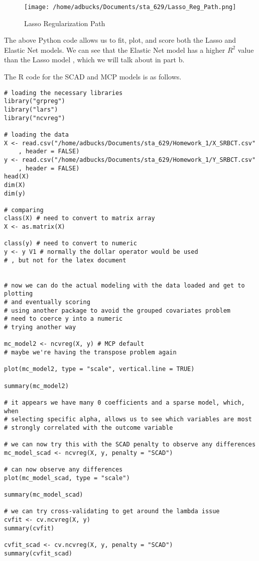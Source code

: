 \documentclass[12pt, letterpaper]{article}
\begin{document}
\begin{figure}
\texttt{[image: /home/adbucks/Documents/sta\_629/Lasso\_Reg\_Path.png]} 
\caption{Lasso Regularization Path} 
\end{figure} 


The above Python code allows us to fit, plot, and score both the Lasso and Elastic Net models. We can see that the Elastic Net model has a higher $R^2$ value than the Lasso model
, which we will talk about in part b. 

The R code for the SCAD and MCP models is as follows. 

\begin{verbatim} 
# loading the necessary libraries 
library("grpreg")
library("lars")
library("ncvreg")

# loading the data 
X <- read.csv("/home/adbucks/Documents/sta_629/Homework_1/X_SRBCT.csv"
	, header = FALSE)
y <- read.csv("/home/adbucks/Documents/sta_629/Homework_1/Y_SRBCT.csv"
	, header = FALSE) 
head(X)
dim(X)
dim(y)

# comparing 
class(X) # need to convert to matrix array 
X <- as.matrix(X)

class(y) # need to convert to numeric
y <- y V1 # normally the dollar operator would be used
# , but not for the latex document 


# now we can do the actual modeling with the data loaded and get to plotting
# and eventually scoring 
# using another package to avoid the grouped covariates problem 
# need to coerce y into a numeric 
# trying another way 

mc_model2 <- ncvreg(X, y) # MCP default 
# maybe we're having the transpose problem again

plot(mc_model2, type = "scale", vertical.line = TRUE)

summary(mc_model2)

# it appears we have many 0 coefficients and a sparse model, which, when 
# selecting specific alpha, allows us to see which variables are most 
# strongly correlated with the outcome variable

# we can now try this with the SCAD penalty to observe any differences
mc_model_scad <- ncvreg(X, y, penalty = "SCAD")

# can now observe any differences 
plot(mc_model_scad, type = "scale")

summary(mc_model_scad)

# we can try cross-validating to get around the lambda issue 
cvfit <- cv.ncvreg(X, y)
summary(cvfit)

cvfit_scad <- cv.ncvreg(X, y, penalty = "SCAD")
summary(cvfit_scad)
\end{verbatim}
\end{document}

